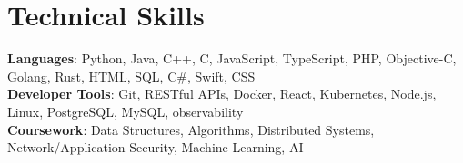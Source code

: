 \documentclass[letterpaper,11pt]{article}
\begin{document}
\section{Technical Skills}
 \begin{itemize}[leftmargin=0.15in, label={}]
    \small{\item{
     \textbf{Languages}{: Python, Java, C++, C, JavaScript, TypeScript, PHP, Objective-C, Golang, Rust, HTML, SQL, C\#, Swift, CSS} \\
     \textbf{Developer Tools}{: Git, RESTful APIs, Docker, React, Kubernetes, Node.js, Linux, PostgreSQL, MySQL, observability} \\
     
     \textbf{Coursework}{: Data Structures, Algorithms, Distributed Systems, Network/Application Security, Machine Learning, AI} \\
    }
    }
  \end{itemize}
\end{document}

